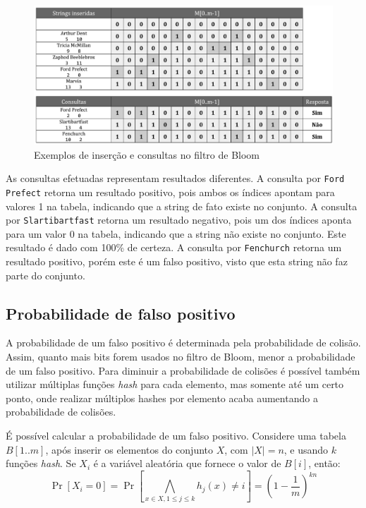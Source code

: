 \begin{figure}[!htbp]
  \centering
  \includegraphics[scale=0.6]{figures/bloom_example.pdf}
  \caption{Exemplos de inserção e consultas no filtro de Bloom}
  \label{fig:bloom_example}
\end{figure}

As consultas efetuadas representam resultados diferentes. A consulta por \texttt{Ford Prefect} retorna um resultado positivo, pois ambos os índices apontam para valores 1 na tabela, indicando que a string de fato existe no conjunto. A consulta por \texttt{Slartibartfast} retorna um resultado negativo, pois um dos índices aponta para um valor 0 na tabela, indicando que a string não existe no conjunto. Este resultado é dado com 100\% de certeza. A consulta por \texttt{Fenchurch} retorna um resultado positivo, porém este é um falso positivo, visto que esta string não faz parte do conjunto.

\subsection{Probabilidade de falso positivo}\label{sec:bloom:false}

A probabilidade de um falso positivo é determinada pela probabilidade de colisão. Assim, quanto mais bits forem usados no filtro de Bloom, menor a probabilidade de um falso positivo. Para diminuir a probabilidade de colisões é possível também utilizar múltiplas funções \emph{hash} para cada elemento, mas somente até um certo ponto, onde realizar múltiplos hashes por elemento acaba aumentando a probabilidade de colisões.

É possível calcular a probabilidade de um falso positivo. Considere uma tabela $B[1..m]$, após inserir os elementos do conjunto $X$, com $|X| = n$, e usando $k$ funções \emph{hash}. Se $X_i$ é a variável aleatória que fornece o valor de $B[i]$, então:
\[
\Pr[X_i = 0] = \Pr\left[\bigwedge_{x \in X, 1 \leq j \leq k} h_j(x) \neq i \right] = \left( 1 - \frac{1}{m}\right)^{kn}
\]

